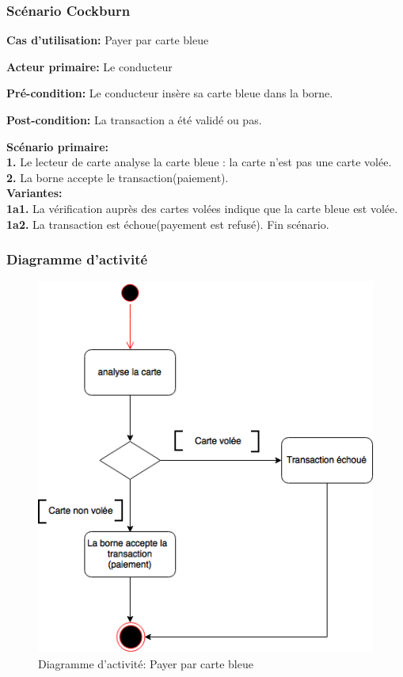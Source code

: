 \subsubsection{Scénario Cockburn}
\textbf{Cas d'utilisation:} Payer par carte bleue

\textbf{Acteur primaire:} Le conducteur

\textbf{Pré-condition: } Le conducteur insère sa carte bleue dans la borne.

\textbf{Post-condition: }  La transaction a été validé ou pas.


\textbf{Scénario primaire: } \\
    \textbf{1.} Le lecteur de carte analyse la  carte bleue : la carte n’est pas une carte volée.\\ 
    \textbf{2.} La borne accepte le transaction(paiement). \\
  
\textbf{Variantes:}\\
    \textbf{1a1.} La vérification auprès des cartes volées indique que la carte bleue est volée.\\
    \textbf{1a2.} La transaction est échoue(payement est refusé). Fin scénario.\\
    
\newpage
\subsubsection{Diagramme d'activité}
\begin{figure}[h]
    \centering
    \includegraphics[scale=0.8]{02_Desenvolvimento/TD2/images/DAPayeBleu.png}
    \caption{Diagramme d'activité: Payer par carte bleue}
\end{figure}
\newpage

